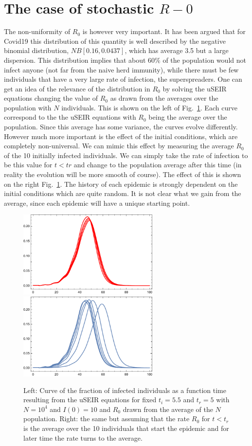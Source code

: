 \documentclass[a4paper,oneside,11pt]{article}
\begin{document}
\section{The case of stochastic $R-0$}
\label{sec:useir} 
 The non-uniformity of $R_0$ is however very important. It has been argued that for Covid19 this distribution of this quantity is well described by the negative binomial distribution, $NB[0.16,0.0437]$, which has average 3.5 but a large dispersion. This distribution implies that about $60\%$ of the population would not infect anyone (not far from the naive herd immunity), while there must be few individuals that have a very large rate of infection, the superspreaders. One can get an idea of the relevance of the distribution in $R_0$ by solving the uSEIR equations changing the value of $R_0$  as drawn from the averages over the population with $N$ individuals. This is shown on the left of Fig.~\ref{fig:dispersion}. Each curve correspond to the the uSEIR equations with $R_0$ being the average over the population. Since this average has some variance, the curves evolve differently. However much more important is the effect of the initial conditions, which are completely non-universal. We can mimic this effect by measuring the average $R_0$ of the 10 initially infected individuals.  We can simply take the rate of infection to be this value for $t< tr$ and change to the population average after this time (in reality the evolution will be more smooth of course). The effect of this is shown on the right Fig.~\ref{fig:dispersion}. The history of each epidemic is strongly dependent on the initial conditions which are quite random. It is not clear what we gain 
 from the average, since each epidemic will have a unique starting point. 
\begin{figure}[h!]
  \centering
  \includegraphics[width=7cm]{NBdisR0.pdf}   \includegraphics[width=7cm]{NBdisR00.pdf}
  \caption{ Left: Curve of the fraction of infected individuals as a function time resulting from the uSEIR equations  for fixed $t_i =5.5$ and $t_r=5$ with $N=10^4$ and $I(0)=10$ and $R_0$ drawn from the average of the $N$ population. Right: the same but assuming that the rate  $R_0$ for $t<t_r$  is the average over the 10 individuals that start the epidemic and for later time the rate turns to the average. }
  \label{fig:dispersion}
   \end{figure}  
   
\end{document}
